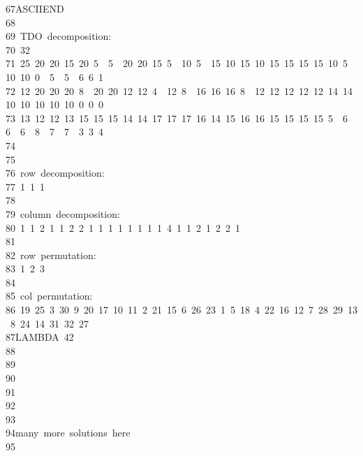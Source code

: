 \begin{tabbing}
67\>ASCIIEND\\[-7pt]
68\>\\[-7pt]
69\>\ TDO\ decomposition:\\[-7pt]
70\ 32\\[-7pt]
71\ 25\ 20\ 20\ 15\ 20\ 5\ \ 5\ \ 20\ 20\ 15\ 5\ \ 10\ 5\ \ 15\ 10\ 15\ 10\ 15\ 15\ 15\ 15\ 10\ 5\ \ 10\ 10\ 0\ \ 5\ \ 5\ \ 6\ 6\ 1\ \\[-7pt]
72\ 12\ 20\ 20\ 20\ 8\ \ 20\ 20\ 12\ 12\ 4\ \ 12\ 8\ \ 16\ 16\ 16\ 8\ \ 12\ 12\ 12\ 12\ 12\ 14\ 14\ 10\ 10\ 10\ 10\ 10\ 0\ 0\ 0\ \\[-7pt]
73\ 13\ 12\ 12\ 13\ 15\ 15\ 15\ 14\ 14\ 17\ 17\ 17\ 16\ 14\ 15\ 16\ 16\ 15\ 15\ 15\ 15\ 5\ \ 6\ \ 6\ \ 6\ \ 8\ \ 7\ \ 7\ \ 3\ 3\ 4\ \\[-7pt]
74\>\\[-7pt]
75\>\\[-7pt]
76\>\ row\ decomposition:\\[-7pt]
77\>\ 1\ 1\ 1\ \\[-7pt]
78\>\\[-7pt]
79\>\ column\ decomposition:\\[-7pt]
80\>\ 1\ 1\ 2\ 1\ 1\ 2\ 2\ 1\ 1\ 1\ 1\ 1\ 1\ 1\ 1\ 4\ 1\ 1\ 2\ 1\ 2\ 2\ 1\ \\[-7pt]
81\>\\[-7pt]
82\>\ row\ permutation:\\[-7pt]
83\>\ 1\ 2\ 3\ \\[-7pt]
84\>\\[-7pt]
85\>\ col\ permutation:\\[-7pt]
86\>\ 19\ 25\ 3\ 30\ 9\ 20\ 17\ 10\ 11\ 2\ 21\ 15\ 6\ 26\ 23\ 1\ 5\ 18\ 4\ 22\ 16\ 12\ 7\ 28\ 29\ 13\ 8\ 24\ 14\ 31\ 32\ 27\ \\[-7pt]
87\>LAMBDA\ 42\\[-7pt]
88\\[-7pt]
89\\[-7pt]
90\\[-7pt]
91\\[-7pt]
92\\[-7pt]
93\>\\[-7pt]
94\>many\ more\ solutions\ here\\[-7pt]
95\>\\[-7pt]

\end{tabbing}
